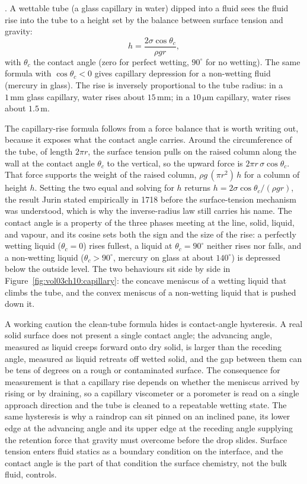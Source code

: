 . A wettable tube (a glass capillary in
water) dipped into a fluid sees the fluid rise into the tube to
a height set by the balance between surface tension and gravity:
\[
h = \frac{2\sigma \cos\theta_c}{\rho g r},
\]
with $\theta_c$ the contact angle (zero for perfect wetting,
$90^{\circ}$ for no wetting). The same formula with $\cos\theta_c
< 0$ gives capillary depression for a non-wetting fluid (mercury
in glass). The rise is inversely proportional to the tube radius:
in a $1\,\si{\milli\meter}$ glass capillary, water rises about
$15\,\si{\milli\meter}$; in a $10\,\si{\micro\meter}$ capillary,
water rises about $1.5\,\si{\meter}$.

The capillary-rise formula follows from a force balance that is worth
writing out, because it exposes what the contact angle carries. Around the
circumference of the tube, of length $2\pi r$, the surface tension pulls on
the raised column along the wall at the contact angle $\theta_c$ to the
vertical, so the upward force is $2\pi r\,\sigma\cos\theta_c$. That force
supports the weight of the raised column, $\rho g\,(\pi r^2)\,h$ for a
column of height $h$. Setting the two equal and solving for $h$ returns
$h=2\sigma\cos\theta_c/(\rho g r)$, the result Jurin stated empirically in
1718 before the surface-tension mechanism was understood, which is why the
inverse-radius law still carries his name. The contact angle is a property
of the three phases meeting at the line, solid, liquid, and vapour, and
its cosine sets both the sign and the size of the rise: a perfectly
wetting liquid ($\theta_c=0$) rises fullest, a liquid at $\theta_c=
90^{\circ}$ neither rises nor falls, and a non-wetting liquid
($\theta_c>90^{\circ}$, mercury on glass at about $140^{\circ}$) is
depressed below the outside level. The two behaviours sit side by side in
Figure~\ref{fig:vol03ch10:capillary}: the concave meniscus of a wetting
liquid that climbs the tube, and the convex meniscus of a non-wetting
liquid that is pushed down it.



A working caution the clean-tube formula hides is contact-angle
hysteresis. A real solid surface does not present a single contact angle;
the advancing angle, measured as liquid creeps forward onto dry solid, is
larger than the receding angle, measured as liquid retreats off wetted
solid, and the gap between them can be tens of degrees on a rough or
contaminated surface. The consequence for measurement is that a capillary
rise depends on whether the meniscus arrived by rising or by draining, so a
capillary viscometer or a porometer is read on a single approach direction
and the tube is cleaned to a repeatable wetting state. The same hysteresis
is why a raindrop can sit pinned on an inclined pane, its lower edge at the
advancing angle and its upper edge at the receding angle supplying the
retention force that gravity must overcome before the drop slides. Surface
tension enters fluid statics as a boundary condition on the interface, and
the contact angle is the part of that condition the surface chemistry, not
the bulk fluid, controls.

